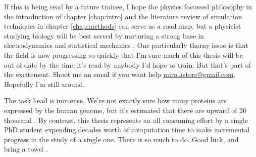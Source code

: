 If this is being read by a future trainee, I hope the physics focussed philosophy in the introduction of chapter \ref{chap:intro} and the literature review of simulation techniques in chapter \ref{chap:methods} can serve as a road map, but a physicist studying biology will be best served by nurturing a strong base in electrodynamics and statistical mechanics \cite{griffiths2017, reif2009, zuckerman2010}. One particularly thorny issue is that the field is now progressing so quickly that I'm sure much of this thesis will be out of date by the time it's read by anybody I'd hope to train. But that's part of the excitement. Shoot me an email if you want help \href{mailto:miro.astore@gmailcom}{miro.astore@gmail.com}. Hopefully I'm still around.

The task head is immense. We're not exactly sure how many proteins are expressed by the human genome, but it's estimated that there are upward of 20 thousand \cite{salzberg2018}. By contrast, this thesis represents an all consuming effort by a single PhD student expending decades worth of computation time to make incremental progress in the study of a single one. There is so much to do. Good luck, and bring a towel \cite{adams1979}. 

